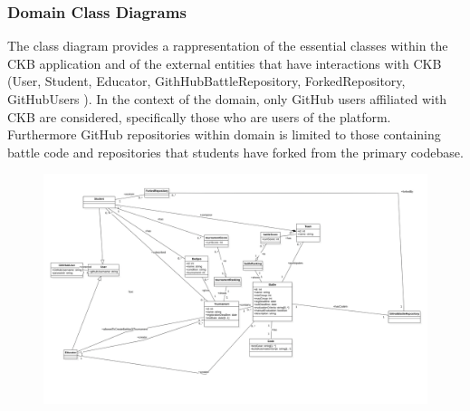 
\subsubsection{Domain Class Diagrams}

The class diagram  provides a rappresentation of the essential classes within the CKB application and of the external entities that have interactions with CKB (User, Student, Educator, GithHubBattleRepository, ForkedRepository, GitHubUsers ).
In the context of the domain, only GitHub users affiliated with CKB are considered, specifically those who are users of the platform. Furthermore GitHub repositories within domain is limited to those containing battle code and repositories that students have forked from the primary codebase.


\begin{figure}[]    
    \includegraphics[width=1\textwidth]{2Overall_Description/res/FINALCD.png}
\end{figure}
\clearpage
